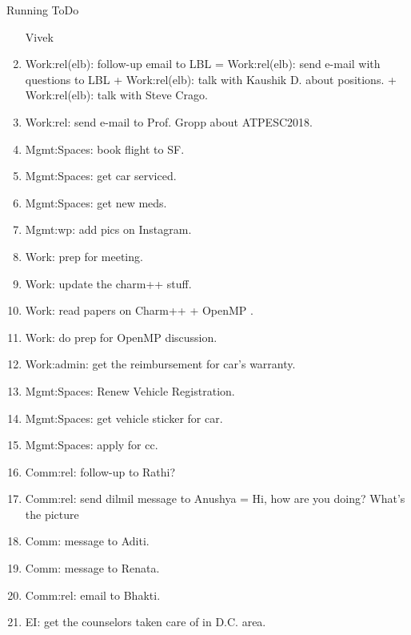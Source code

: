 \begin{columns}
\begin{column}{0.6\linewidth}
\begin{block}{Running ToDo}
\begin{enumerate}
        Vivek


      \item \tiny Work:rel(elb): follow-up email to LBL =
        Work:rel(elb): send e-mail with questions to LBL +
        Work:rel(elb): talk with Kaushik D. about positions.  +
        Work:rel(elb): talk with Steve Crago. 
        
      \item \tiny Work:rel: send e-mail to Prof. Gropp about ATPESC2018.  

      \item \tiny Mgmt:Spaces: book flight to SF. 

      \item \tiny Mgmt:Spaces: get car serviced. 
      \item \tiny Mgmt:Spaces: get new meds. 
      \item \tiny Mgmt:wp: add pics on Instagram. 

      \item \tiny Work: prep for meeting.

      \item \tiny Work: update the charm++ stuff. 
      \item \tiny Work: read papers on Charm++ + OpenMP . 
      \item \tiny Work: do prep for OpenMP discussion.

      \item \tiny Work:admin: get the reimbursement for car’s warranty.  
          
      \item \tiny Mgmt:Spaces: Renew Vehicle Registration. 
      \item \tiny Mgmt:Spaces: get vehicle sticker for car. 
      \item \tiny Mgmt:Spaces: apply for cc. 

      \item \tiny Comm:rel: follow-up to Rathi? 
      \item \tiny Comm:rel: send dilmil message to Anushya = Hi, how
        are you doing? What's the picture 
      \item \tiny Comm: message to Aditi. 

      \item \tiny Comm: message to Renata.
      \item \tiny Comm:rel: email to Bhakti. 

      \item \tiny EI: get the counselors taken care of in D.C. area. 
       

\end{enumerate}
\end{block}
\end{column}
\end{columns}
